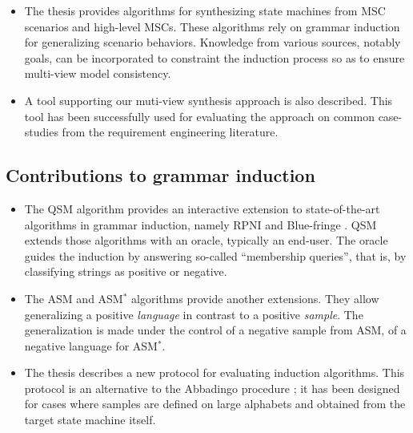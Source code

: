 \begin{itemize}

\item The thesis provides algorithms for synthesizing state machines from MSC scenarios and high-level MSCs. These algorithms rely on grammar induction for generalizing scenario behaviors. Knowledge from various sources, notably goals, can be incorporated to constraint the induction process so as to ensure multi-view model consistency.

\item A tool supporting our muti-view synthesis approach is also described. This tool has been successfully used for evaluating the approach on common case-studies from the requirement engineering literature. 

\end{itemize}


\subsection{Contributions to grammar induction\label{subsection:intro-contrib-grammar-induction}}

\begin{itemize}

\item The QSM algorithm provides an interactive extension to state-of-the-art algorithms in grammar induction, namely RPNI and Blue-fringe \cite{Oncina:1992, Lang:1998}. QSM extends those algorithms with an oracle, typically an end-user. The oracle guides the induction by answering so-called ``membership queries'', that is, by classifying strings as positive or negative.

\item The ASM and ASM$^*$ algorithms provide another extensions. They allow generalizing a positive \emph{language} in contrast to a positive \emph{sample}. The generalization is made under the control of a negative sample from ASM, of a negative language for ASM$^*$.

\item The thesis describes a new protocol for evaluating induction algorithms. This protocol is an alternative to the Abbadingo procedure \cite{Lang:1998}; it has been designed for cases where samples are defined on large alphabets and obtained from the target state machine itself. 

\end{itemize}

